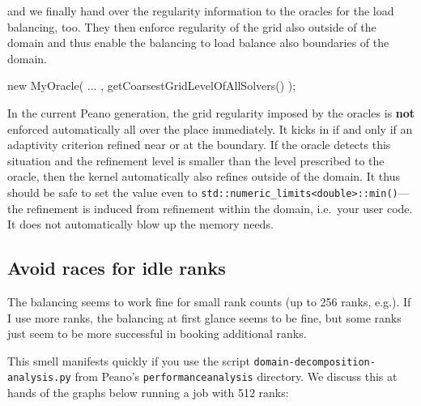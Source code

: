 \noindent
and we finally hand over the regularity information to the oracles for the load
balancing, too.
They then enforce regularity of the grid also outside of the domain and thus
enable the balancing to load balance also boundaries of the domain.
\begin{code}
  new MyOracle( ... , getCoarsestGridLevelOfAllSolvers() );
\end{code}


\begin{remark}
In the current Peano generation, the grid regularity imposed by the oracles is
{\bf not} enforced automatically all over the place immediately. 
It kicks in if and only if an adaptivity criterion refined near or at the
boundary. 
If the oracle detects this situation and the refinement level is smaller than
the level prescribed to the oracle, then the kernel automatically also refines
outside of the domain.
It thus should be safe to set the value even to
\texttt{std::numeric\_limits\textless double\textgreater ::min()}---the
refinement is induced from refinement within the domain, i.e.~your user code.
It does not automatically blow up the memory needs.
\end{remark}


\subsection{Avoid races for idle ranks}

\begin{smell}
  The balancing seems to work fine for small rank counts (up to 256 ranks,
  e.g.). If I use more ranks, the balancing at first glance seems to be fine,
  but some ranks just seem to be more successful in booking additional ranks.
\end{smell}

\noindent
This smell manifests quickly if you use the script
\texttt{domain-decomposition-analysis.py} from Peano's
\texttt{performanceanalysis} directory. 
We discuss this at hands of the graphs below running a job with 512 ranks: 

